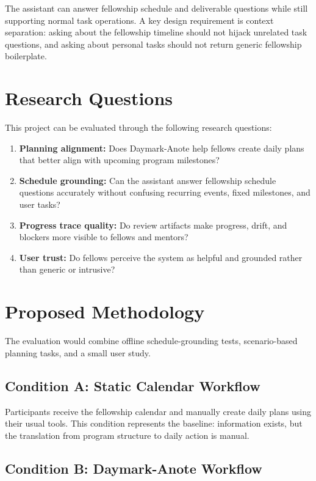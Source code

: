 \documentclass[11pt]{article}
\begin{document}
The assistant can answer fellowship schedule and deliverable questions while still supporting normal task operations. A key design requirement is context separation: asking about the fellowship timeline should not hijack unrelated task questions, and asking about personal tasks should not return generic fellowship boilerplate.

\section{Research Questions}

This project can be evaluated through the following research questions:

\begin{enumerate}[leftmargin=*]
  \item \textbf{Planning alignment:} Does Daymark-Anote help fellows create daily plans that better align with upcoming program milestones?
  \item \textbf{Schedule grounding:} Can the assistant answer fellowship schedule questions accurately without confusing recurring events, fixed milestones, and user tasks?
  \item \textbf{Progress trace quality:} Do review artifacts make progress, drift, and blockers more visible to fellows and mentors?
  \item \textbf{User trust:} Do fellows perceive the system as helpful and grounded rather than generic or intrusive?
\end{enumerate}

\section{Proposed Methodology}

The evaluation would combine offline schedule-grounding tests, scenario-based planning tasks, and a small user study.

\subsection{Condition A: Static Calendar Workflow}

Participants receive the fellowship calendar and manually create daily plans using their usual tools. This condition represents the baseline: information exists, but the translation from program structure to daily action is manual.

\subsection{Condition B: Daymark-Anote Workflow}
\end{document}
